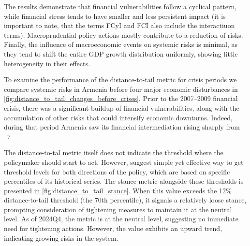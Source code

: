 The results demonstrate that financial vulnerabilities follow a cyclical pattern, while financial stress tends to have smaller and less persistent impact (it is important to note, that the terms FCyI and FCI also include the interactiuon terms). Macroprudential policy actions mostly contribute to a reduction of risks. Finally, the influence of macroeconomic events on systemic risks is minimal, as they tend to shift the entire GDP growth distribution uniformly, showing little heterogeneity in their effects.

To examine the performance of the distance-to-tail metric for crisis periods we compare systemic risks in Armenia before four major economic disturbances in \autoref{fig:distance_to_tail_changes_before_crises}. Prior to the 2007–2009 financial crisis, there was a significant buildup of financial vulnerabilities, along with the accumulation of other risks that could intensify economic downturns. Indeed, during that period Armenia saw its financial intermediation rising sharply from ~7%

The distance-to-tal metric itself does not indicate the threshold where the policymaker should start to act. However, \citep{esrb2021} suggest simple yet effective way to get threshold levels for both directions of the policy, which are based on specific percentiles of its historical series. The stance metric alongside these thresholds is presented in \autoref{fig:distance_to_tail_stance}. When this value exceeds the 12\% distance-to-tail threshold (the 70th percentile), it signals a relatively loose stance, prompting consideration of tightening measures to maintain it at the neutral level. As of 2024Q4, the metric is at the neutral level, suggesting no immediate need for tightening actions. However, the value exhibits an upward trend, indicating growing risks in the system.

